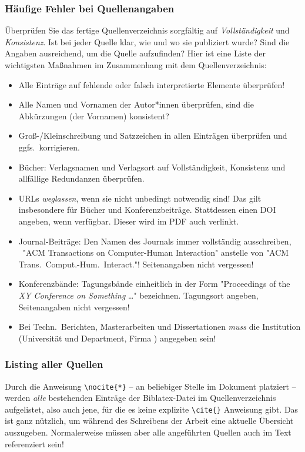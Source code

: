 \subsubsection{Häufige Fehler bei Quellenangaben}

Überprüfen Sie das fertige Quellenverzeichnis sorgfältig auf \emph{Vollständigkeit} und \emph{Konsistenz}. Ist bei
jeder Quelle klar, wie und wo sie publiziert wurde? Sind die Angaben ausreichend, um die Quelle aufzufinden? Hier ist
eine Liste der wichtigsten Maßnahmen im Zusammenhang mit dem Quellenverzeichnis:
%
\begin{itemize}
\item
Alle Einträge auf fehlende oder falsch interpretierte Elemente überprüfen!
\item
Alle Namen und Vornamen der Autor*innen überprüfen, sind die Abkürzungen (der Vornamen) konsistent?
\item
Groß-/Kleinschreibung und Satzzeichen in allen  Einträgen überprüfen und ggfs.\ korrigieren.
\item
Bücher: Verlagsnamen und Verlagsort auf Vollständigkeit, Konsistenz und allfällige
Redundanzen überprüfen.
\item
URLs \emph{weglassen}, wenn sie nicht unbedingt notwendig sind! Das gilt insbesondere für Bücher und
Konferenzbeiträge. Stattdessen einen DOI angeben, wenn verfügbar. Dieser wird im PDF auch verlinkt.
\item
Journal-Beiträge: Den Namen des Journals immer vollständig ausschreiben, \zB\ "ACM Transactions on Computer-Human
Interaction" anstelle von "ACM Trans.\ Comput.-Hum.\ Interact."! Seitenangaben nicht vergessen!
\item
Konferenzbände: Tagungsbände einheitlich in der Form "Proceedings of the \emph{XY Conference on Something} \ldots"
bezeichnen. Tagungsort angeben, Seitenangaben nicht vergessen!
\item
Bei Techn.\ Berichten, Masterarbeiten und Dissertationen \emph{muss} die Institution (Universität und Department,
Firma \etc) angegeben sein!
\end{itemize}
 

\subsubsection{Listing aller Quellen}

Durch die Anweisung \verb!\nocite{*}! -- an beliebiger Stelle im Dokument platziert -- werden \emph{alle} bestehenden
Einträge der Biblatex-Datei im Quellenverzeichnis aufgelistet, also auch jene, für die es keine explizite
\verb!\cite{}! Anweisung gibt. Das ist ganz nützlich, um während des Schreibens der Arbeit eine aktuelle Übersicht
auszugeben. Normalerweise müssen aber alle angeführten Quellen auch im Text referenziert sein!




